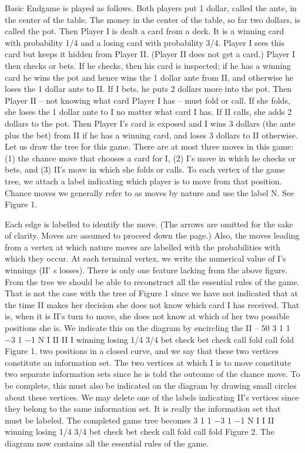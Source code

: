 Basic Endgame is played as follows. Both players put 1 dollar, called the ante, in the
center of the table. The money in the center of the table, so far two dollars, is called the
pot. Then Player I is dealt a card from a deck. It is a winning card with probability 1/4
and a losing card with probability 3/4. Player I sees this card but keeps it hidden from
Player II. (Player II does not get a card.) Player I then checks or bets. If he checks, then
his card is inspected; if he has a winning card he wins the pot and hence wins the 1 dollar
ante from II, and otherwise he loses the 1 dollar ante to II. If I bets, he puts 2 dollars more
into the pot. Then Player II – not knowing what card Player I has – must fold or call. If
she folds, she loses the 1 dollar ante to I no matter what card I has. If II calls, she adds 2
dollars to the pot. Then Player I’s card is exposed and I wins 3 dollars (the ante plus the
bet) from II if he has a winning card, and loses 3 dollars to II otherwise.
Let us draw the tree for this game. There are at most three moves in this game: (1)
the chance move that chooses a card for I, (2) I’s move in which he checks or bets, and (3)
II’s move in which she folds or calls. To each vertex of the game tree, we attach a label
indicating which player is to move from that position. Chance moves we generally refer to
as moves by nature and use the label N. See Figure 1.

Each edge is labelled to identify the move. (The arrows are omitted for the sake of
clarity. Moves are assumed to proceed down the page.) Also, the moves leading from a
vertex at which nature moves are labelled with the probabilities with which they occur.
At each terminal vertex, we write the numerical value of I’s winnings (II’ s losses).
There is only one feature lacking from the above figure. From the tree we should be
able to reconstruct all the essential rules of the game. That is not the case with the tree of
Figure 1 since we have not indicated that at the time II makes her decision she does not
know which card I has received. That is, when it is II’s turn to move, she does not know at
which of her two possible positions she is. We indicate this on the diagram by encircling the
II – 50
3 1
1
−3 1
−1
N
I
II II
I
winning losing
1/4 3/4
bet check bet check
call fold call fold
Figure 1.
two positions in a closed curve, and we say that these two vertices constitute an information
set. The two vertices at which I is to move constitute two separate information sets since
he is told the outcome of the chance move. To be complete, this must also be indicated
on the diagram by drawing small circles about these vertices. We may delete one of the
labels indicating II’s vertices since they belong to the same information set. It is really
the information set that must be labeled. The completed game tree becomes
3 1
1
−3 1
−1
N
I I
II
winning losing
1/4 3/4
bet check bet check
call fold call fold
Figure 2.
The diagram now contains all the essential rules of the game.

